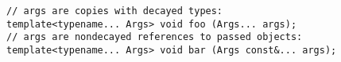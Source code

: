 \begin{lstlisting}[style=styleCXX]
// args are copies with decayed types:
template<typename... Args> void foo (Args... args);
// args are nondecayed references to passed objects:
template<typename... Args> void bar (Args const&... args);
\end{lstlisting}


































